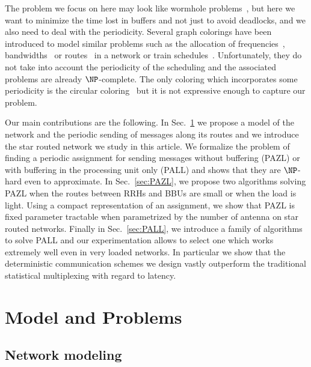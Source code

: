 \documentclass[10pt, conference, letterpaper]{IEEEtran}
\begin{document}
The problem we focus on here may look like wormhole problems~\cite{cole1996benefit}, but here we want to minimize the time lost in buffers and not just to avoid deadlocks, and we also need to deal with the periodicity. Several graph colorings have been introduced to model similar problems such as the allocation of frequencies~\cite{borndorfer1998frequency}, bandwidths~\cite{erlebach2001complexity} or routes~\cite{cole1996benefit} in a network or train schedules~\cite{strotmann2007railway}. Unfortunately, they do not take into account the periodicity of the scheduling and the associated problems are already $\NP$-complete. The only coloring which incorporates some periodicity is the circular coloring~\cite{zhou2013multiple, zhu2001circular,zhu2006recent} but it is not expressive enough to capture our problem.



Our main contributions are the following.
 In Sec.~\ref{sec:def} we propose a model of the network and the periodic sending of messages along its routes
 and we introduce the star routed network we study in this article. 
 We formalize the problem of finding a periodic assignment for sending messages without buffering (PAZL) or
 with buffering in the processing unit only (PALL) and shows that they are $\NP$-hard even to approximate.
In Sec.~\ref{sec:PAZL}, we propose two algorithms solving PAZL when the routes between RRHs and BBUs are small
or when the load is light. Using a compact representation of an assignment, we show that PAZL is fixed parameter tractable when parametrized by the number of antenna on star routed networks.
Finally in Sec.~\ref{sec:PALL}, we introduce a family of algorithms to solve PALL and our experimentation 
allows to select one which works extremely well even in very loaded networks. In particular we show that the deterministic communication schemes we design vastly outperform the traditional statistical multiplexing with regard to latency. 


\section{Model and Problems}\label{sec:def}

  \subsection{Network modeling}
  
\end{document}
